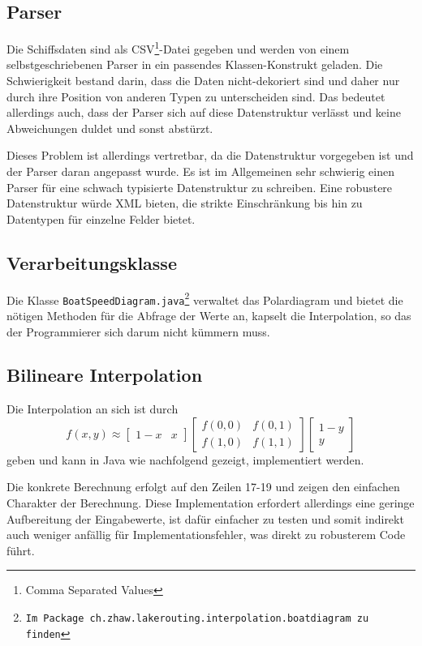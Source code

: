 \subsection{Parser}
Die Schiffsdaten sind als CSV\footnote{Comma Separated Values}-Datei gegeben
und werden von einem selbst\-geschriebenen Parser in ein passendes
Klassen-Konstrukt geladen. Die Schwierigkeit bestand darin, dass die Daten
nicht-dekoriert sind und daher nur durch ihre Position von anderen Typen zu
unterscheiden sind. Das bedeutet allerdings auch, dass der Parser sich auf
diese Datenstruktur verlässt und keine Abweichungen duldet und sonst abstürzt.

Dieses Problem ist allerdings vertretbar, da die Datenstruktur vorgegeben ist
und der Parser daran angepasst wurde. Es ist im Allgemeinen sehr schwierig
einen Parser für eine schwach typisierte Datenstruktur zu schreiben. Eine
robustere Datenstruktur würde XML bieten, die strikte Einschränkung bis hin zu
Datentypen für einzelne Felder bietet.

\subsection{Verarbeitungsklasse}
Die Klasse \texttt{BoatSpeedDiagram.java\footnote{Im Package
ch.zhaw.lakerouting.interpolation.boatdiagram zu finden}} verwaltet das
Polardiagram und bietet die nötigen Methoden für die Abfrage der Werte an,
kapselt die Interpolation, so das der Programmierer sich darum nicht kümmern
muss.

\subsection{Bilineare Interpolation}\label{sss:bilinearinterpolation}
Die Interpolation an sich ist durch 
\begin{equation}
f(x,y) \approx \begin{bmatrix} 1-x & x \end{bmatrix} \begin{bmatrix}
f(0,0) & f(0,1) \\ f(1,0) & f(1,1) \end{bmatrix} \begin{bmatrix} 1 - y
\\ y \end{bmatrix}
\label{eq:bilineareinterpolation}
\end{equation}
geben und kann in Java wie nachfolgend gezeigt, implementiert werden.

 
Die konkrete Berechnung erfolgt auf den Zeilen 17-19 und zeigen den einfachen
Charakter der Berechnung. Diese Implementation erfordert allerdings eine
geringe Aufbereitung der Eingabewerte, ist dafür einfacher zu testen und somit
indirekt auch weniger anfällig für Implementationsfehler, was direkt zu
robusterem Code führt.

